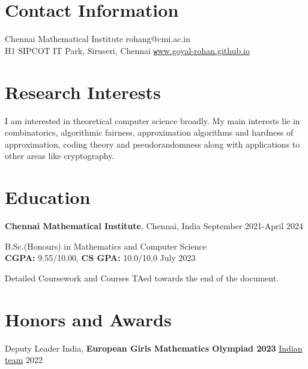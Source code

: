 \documentclass[margin,line, 10pt]{res}
\begin{document}

\begin{resume}
\section{\sc Contact Information}
Chennai Mathematical Institute \hfill {rohang@cmi.ac.in}\\
H1 SIPCOT IT Park, Siruseri, Chennai \hfill \href{https://goyal-rohan.github.io/}{\texttt www.goyal-rohan.github.io}

\section{\sc Research Interests}
I am interested in theoretical computer science broadly. My main interests lie in combinatorics, algorithmic fairness, approximation algorithms and hardness of approximation, coding theory and pseudorandomness along with applications to other areas like cryptography.
\section{\sc Education}


{\bf Chennai Mathematical Institute}, Chennai, India \hfill September 2021-April 2024

\vspace{-0.4cm}
B.Sc.(Honours) in Mathematics and Computer Science\\ {\bf CGPA:} 9.55/10.00, {\bf CS GPA:} 10.0/10.0 \hfill July 2023


\vspace*{-0.3cm}
Detailed Coursework and Courses TAed towards the end of the document.


\section{\sc Honors and Awards} 
Deputy Leader India, {\bf European Girls Mathematics Olympiad 2023} \href{https://www.egmo.org/egmos/egmo12/countries/country35/}{Indian team} \hfill 2022


\end{resume}
\end{document}
